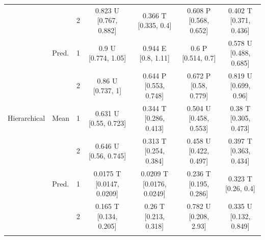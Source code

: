 \begin{tabular}{llccccc}
 &  & 2 & \shortstack{0.823 U \\{} [0.767, 0.882]} & \shortstack{0.366 T \\{} [0.335, 0.4]} & \shortstack{0.608 P \\{} [0.568, 0.652]} & \shortstack{0.402 T \\{} [0.371, 0.436]} \\[2pt]
 & Pred. & 1 & \shortstack{0.9 U \\{} [0.774, 1.05]} & \shortstack{0.944 E \\{} [0.8, 1.11]} & \shortstack{0.6 P \\{} [0.514, 0.7]} & \shortstack{0.578 U \\{} [0.488, 0.685]} \\[2pt]
 &  & 2 & \shortstack{0.86 U \\{} [0.737, 1]} & \shortstack{0.644 P \\{} [0.553, 0.748]} & \shortstack{0.672 P \\{} [0.58, 0.779]} & \shortstack{0.819 U \\{} [0.699, 0.96]} \\[2pt]
\addlinespace
Hierarchical & Mean & 1 & \shortstack{0.631 U \\{} [0.55, 0.723]} & \shortstack{0.344 T \\{} [0.286, 0.413]} & \shortstack{0.504 U \\{} [0.458, 0.553]} & \shortstack{0.38 T \\{} [0.305, 0.473]} \\[2pt]
 &  & 2 & \shortstack{0.646 U \\{} [0.56, 0.745]} & \shortstack{0.313 T \\{} [0.254, 0.384]} & \shortstack{0.458 U \\{} [0.422, 0.497]} & \shortstack{0.397 T \\{} [0.363, 0.434]} \\[2pt]
 & Pred. & 1 & \shortstack{0.0175 T \\{} [0.0147, 0.0209]} & \shortstack{0.0209 T \\{} [0.0176, 0.0249]} & \shortstack{0.236 T \\{} [0.195, 0.286]} & \shortstack{0.323 T \\{} [0.26, 0.4]} \\[2pt]
 &  & 2 & \shortstack{0.165 T \\{} [0.134, 0.205]} & \shortstack{0.26 T \\{} [0.213, 0.318]} & \shortstack{0.782 U \\{} [0.208, 2.93]} & \shortstack{0.335 U \\{} [0.132, 0.849]} \\[2pt]
\addlinespace
\bottomrule
\end{tabular}
